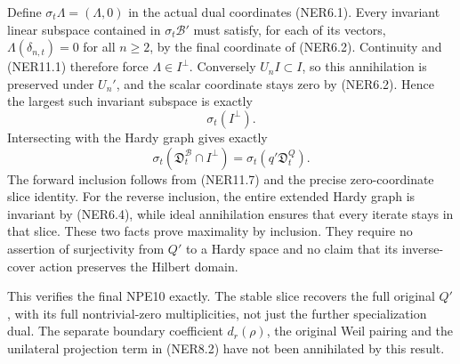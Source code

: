 Define \(\sigma_t\Lambda=(\Lambda,0)\) in the actual dual coordinates
(NER6.1). Every invariant linear subspace contained in
\(\sigma_t\mathcal B'\) must satisfy, for each of its vectors,
\(\Lambda(\delta_{n,t})=0\) for all \(n\ge2\), by the final coordinate
of (NER6.2). Continuity and (NER11.1) therefore force
\(\Lambda\in I^\perp\). Conversely \(U_nI\subset I\), so this
annihilation is preserved under \(U_n'\), and the scalar coordinate
stays zero by (NER6.2). Hence the largest such invariant subspace is
exactly \[
\boxed{\sigma_t(I^\perp).}
\tag{NER11.7}
\] Intersecting with the Hardy graph gives exactly \[
\boxed{\sigma_t(\mathfrak D_t^{\mathcal B}\cap I^\perp)
=\sigma_t(q'\mathfrak D_t^Q).}
\tag{NER11.8}
\] The forward inclusion follows from (NER11.7) and the precise
zero-coordinate slice identity. For the reverse inclusion, the entire
extended Hardy graph is invariant by (NER6.4), while ideal annihilation
ensures that every iterate stays in that slice. These two facts prove
maximality by inclusion. They require no assertion of surjectivity from
\(Q'\) to a Hardy space and no claim that its inverse-cover action
preserves the Hilbert domain.

This verifies the final NPE10 exactly. The stable slice recovers the
full original \(Q'\), with its full nontrivial-zero multiplicities, not
just the further specialization dual. The separate boundary coefficient
\(d_r(\rho)\), the original Weil pairing and the unilateral projection
term in (NER8.2) have not been annihilated by this result.
